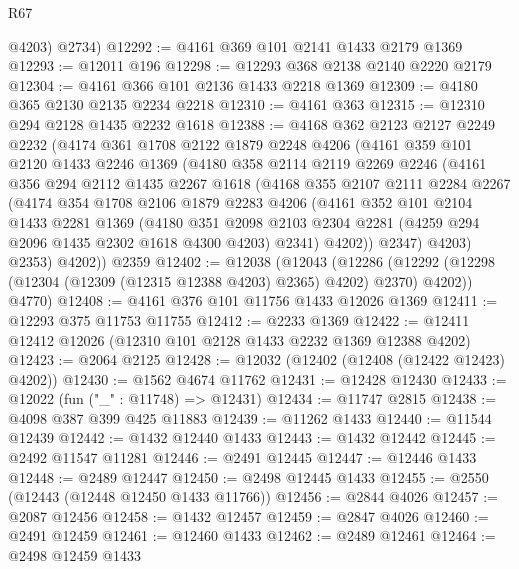 \begin{lexlean}{R67}
\begin{coremodule}
        @4203)
      @2734)
@12292 := @4161 @369 @101 @2141 @1433 @2179 @1369
@12293 := @12011 @196
@12298 := @12293 @368 @2138 @2140 @2220 @2179
@12304 := @4161 @366 @101 @2136 @1433 @2218 @1369
@12309 := @4180 @365 @2130 @2135 @2234 @2218
@12310 := @4161 @363
@12315 := @12310 @294 @2128 @1435 @2232 @1618
@12388 := @4168
    @362
    @2123
    @2127
    @2249
    @2232
    (@4174
      @361
      @1708
      @2122
      @1879
      @2248
      @4206
      (@4161
        @359
        @101
        @2120
        @1433
        @2246
        @1369
        (@4180
          @358
          @2114
          @2119
          @2269
          @2246
          (@4161
            @356
            @294
            @2112
            @1435
            @2267
            @1618
            (@4168
              @355
              @2107
              @2111
              @2284
              @2267
              (@4174
                @354
                @1708
                @2106
                @1879
                @2283
                @4206
                (@4161
                  @352
                  @101
                  @2104
                  @1433
                  @2281
                  @1369
                  (@4180
                    @351
                    @2098
                    @2103
                    @2304
                    @2281
                    (@4259 @294 @2096 @1435 @2302 @1618 @4300 @4203)
                    @2341)
                  @4202))
              @2347)
            @4203)
          @2353)
        @4202))
    @2359
@12402 := @12038
    (@12043
      (@12286 (@12292 (@12298 (@12304 (@12309 (@12315 @12388 @4203) @2365) @4202) @2370) @4202))
      @4770)
@12408 := @4161 @376 @101 @11756 @1433 @12026 @1369
@12411 := @12293 @375 @11753 @11755
@12412 := @2233 @1369
@12422 := @12411 @12412 @12026 (@12310 @101 @2128 @1433 @2232 @1369 @12388 @4202)
@12423 := @2064 @2125
@12428 := @12032 (@12402 (@12408 (@12422 @12423) @4202))
@12430 := @1562 @4674 @11762
@12431 := @12428 @12430
@12433 := @12022 (fun ("_" : @11748) => @12431)
@12434 := @11747 @2815
@12438 := @4098 @387 @399 @425 @11883
@12439 := @11262 @1433
@12440 := @11544 @12439
@12442 := @1432 @12440 @1433
@12443 := @1432 @12442
@12445 := @2492 @11547 @11281
@12446 := @2491 @12445
@12447 := @12446 @1433
@12448 := @2489 @12447
@12450 := @2498 @12445 @1433
@12455 := @2550 (@12443 (@12448 @12450 @1433 @11766))
@12456 := @2844 @4026
@12457 := @2087 @12456
@12458 := @1432 @12457
@12459 := @2847 @4026
@12460 := @2491 @12459
@12461 := @12460 @1433
@12462 := @2489 @12461
@12464 := @2498 @12459 @1433

\end{coremodule}
\end{lexlean}

